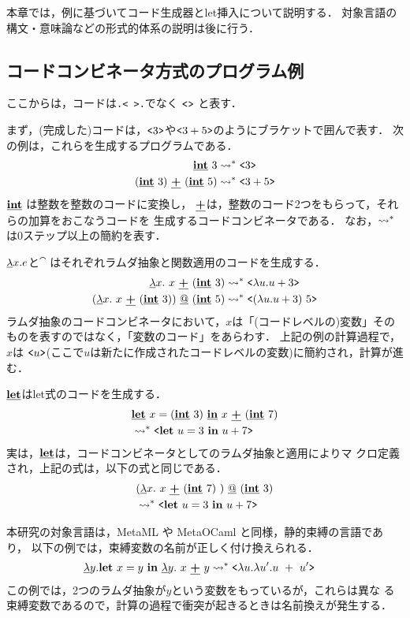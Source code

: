 本章では，例に基づいてコード生成器とlet挿入について説明する．
対象言語の構文・意味論などの形式的体系の説明は後に行う．

\subsection{コードコンビネータ方式のプログラム例}
ここからは，コードは\lstinline|.< >.|でなく $\code{}$ と表す．

まず，(完成した)コードは，$\code{3}$や$\code{3+5}$のようにブラケットで囲んで表す．
次の例は，これらを生成するプログラムである．
\begin{align*}
  \cint~3  & \too \code{3} \\
  (\cint~3)~ \cPlus~ (\cint~5) & \too \code{3 + 5}
\end{align*}
$\cint$ は整数を整数のコードに変換し，
$\cPlus$は，整数のコード2つをもらって，それらの加算をおこなうコードを
生成するコードコンビネータである．
なお，$\too$は0ステップ以上の簡約を表す．

$\cfun{x}{e}$と$\cat$ はそれぞれラムダ抽象と関数適用のコードを生成する．
\begin{align*}
  \cfun{x}{~x ~\cPlus~ (\cint~3)}   & \too \code{\fun{u}{u+3}} \\
  (\cfun{x}{~x ~\cPlus~ (\cint~3)}) \cat (\cint~5) & \too
                                                     \code{(\fun{u}{u+3})~5}
\end{align*}
ラムダ抽象のコードコンビネータにおいて，$x$は「(コードレベルの)変数」その
ものを表すのではなく，「変数のコード」をあらわす．
上記の例の計算過程で，$x$は
$\code{u}$(ここで$u$は新たに作成されたコードレベルの変数)に簡約され，計算が進む．

$\cLet$はlet式のコードを生成する．
\begin{align*}
  & \clet{x}{(\cint~3)}{x~ \cPlus~ (\cint~7)} \\
  & \too \code{\Let~ u = 3~ \In~ u + 7}
\end{align*}
実は，$\cLet$は，コードコンビネータとしてのラムダ抽象と適用によりマ
クロ定義され，上記の式は，以下の式と同じである．
\begin{align*}
  & (\cfun{x}{~x~ \cPlus~ (\cint~7)~}) \cat (\cint~3)  \\
  & \too \code{\Let~ u = 3~ \In~ u + 7}
\end{align*}

本研究の対象言語は，MetaML や MetaOCaml と同様，静的束縛の言語であり，
以下の例では，束縛変数の名前が正しく付け換えられる．
\begin{align*}
  \cfun{y}{\Let~ x = y~ \In~ \cfun{y}{~x~ \cPlus~ y}{}}{}
  & \too \code{\fun{u}{\fun{u'}{u~ +~ u'}}}
\end{align*}
この例では，2つのラムダ抽象が$y$という変数をもっているが，これらは異な
る束縛変数であるので，計算の過程で衝突が起きるときは名前換えが発生する．

